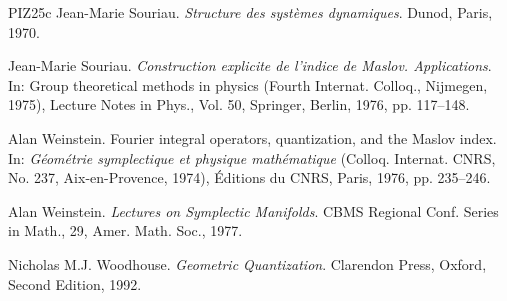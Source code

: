 \documentclass[11pt,reqno,letterpaper,twoside]{amsart}
\theoremstyle{articlestyle}
\theoremstyle{plain}
\theoremstyle{definition}
\newcommand{\0}{\hat{0}}
\newcommand{\1}{\hat{1}}
\begin{document}
\begin{thebibliography}{PIZ25c}
    Jean-Marie Souriau.
    {\em Structure des syst\`emes dynamiques}.
    Dunod, Paris, 1970.
    
    Jean-Marie Souriau.
    \newblock \emph{Construction explicite de l'indice de Maslov. Applications}.
    \newblock In: Group theoretical methods in physics (Fourth Internat. Colloq., Nijmegen, 1975), Lecture Notes in Phys., Vol. 50, Springer, Berlin, 1976, pp. 117--148.
    
    Alan Weinstein.
    Fourier integral operators, quantization, and the Maslov index.
    In: {\em G\'eom\'etrie symplectique et physique math\'ematique}
    (Colloq. Internat. CNRS, No. 237, Aix-en-Provence, 1974),
    \'Editions du CNRS, Paris, 1976, pp. 235--246.
    
    Alan Weinstein.
    \emph{Lectures on Symplectic Manifolds}.
    CBMS Regional Conf. Series in Math., 29, Amer. Math. Soc., 1977.
    
    Nicholas M.J. Woodhouse.
    \emph{Geometric Quantization}.
    Clarendon Press, Oxford, Second Edition, 1992.
    
  \end{thebibliography}
  
\end{document}
